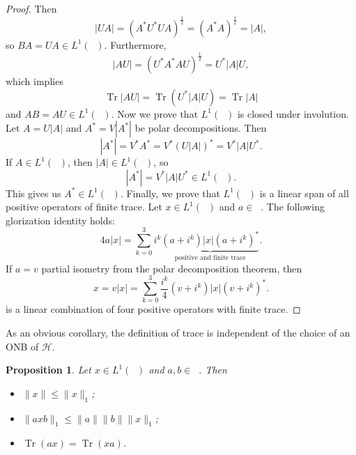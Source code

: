 \documentclass[10pt, a4paper]{article}
\newtheorem{proposition}[thm]{Proposition}
\newenvironment{noticeC}{%
  \tcolorbox[%
  notitle,
  empty,
  enhanced,  %
  breakable,
  coltext=black, 
  fontupper=\rmfamily,
  noparskip,
  sharp corners,
  boxrule=-1pt,  %
  frame hidden,
  left=7pt,  %
  right=7pt,
  top=5pt,
  bottom=5pt,
  before skip=2.5ex plus 2pt,
  after skip=2.5ex plus 2pt,
  overlay unbroken and last={%
  },
  ]}
{\endtcolorbox}
\newenvironment{myproof}%
  {\begin{noticeC}\begin{proof}}%
  {\end{proof}\end{noticeC}}
\DeclareMathOperator{\trace}{Tr}
\DeclareMathOperator{\bh}{\mathcal{B} (\mathcal{H})}
\begin{document}
\begin{myproof}
  Then 
  $$|UA| = (A^* U^* U A)^{\frac{1}{2}} = (A^* A)^{\frac{1}{2}} = |A|,$$
  so $BA = UA \in L^1 (\bh)$. Furthermore,
  $$|AU| = (U^* A^* A U)^{\frac{1}{2}} = U^* |A| U,$$
  which implies 
  $$\trace |AU| = \trace (U^* |A| U) = \trace |A|$$
  and $AB = AU \in L^1 (\bh)$.
  Now we prove that $L^1 (\bh)$ is closed under involution.
  Let $A = U |A|$ and $A^* = V |A^*|$ be polar decompositions. Then 
  $$|A^*| = V^* A^* = V^* (U |A|)^* = V^* |A| U^*.$$
  If $A \in L^1 (\bh)$, then $|A| \in L^1 (\bh)$, so 
  $$|A^*| = V^* |A| U^* \in L^1 (\bh).$$ This gives us $A^* \in L^1 (\bh)$.
  Finally, we prove that $L^1 (\bh)$ is a linear span of all positive operators of finite trace.
  Let $x \in L^1 (\bh)$ and $a \in \bh$. The following glorization identity holds:
  $$4 a |x| = \sum_{k = 0} ^3 i^k \underbrace{(a + i^k) |x| (a + i^k)^*}_{\textrm{positive and finite trace}}.$$
  If $a = v$ partial isometry from the polar decomposition theorem, then 
  $$x = v |x| = \sum_{k = 0} ^3 \frac{i^k}{4} {(v + i^k) |x| (v + i^k)^*}.$$
  is a linear combination of four positive operators with finite trace.
\end{myproof}

As an obvious corollary, the definition of trace is independent of the choice of an ONB of $\mathcal{H}$.


\begin{proposition}
  Let $x \in L^1 (\bh)$ and $a, b \in \bh$. Then 
  \begin{itemize}
    \item $\| x\| \leq \|x\|_1$;
    \item $\| axb\|_1 \leq \| a\| \|b\| \|x\|_1$;
    \item $\trace (ax) = \trace (xa)$.
  \end{itemize}
\end{proposition}
\end{document}
